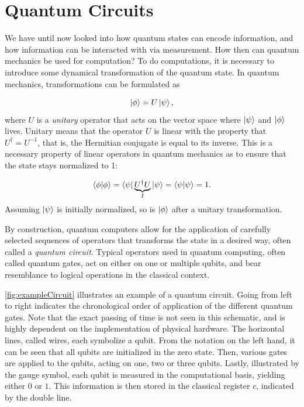 \section{Quantum Circuits}\label{sec:QuantumCircuits}
We have until now looked into how quantum states can encode information, and how information can be interacted with via measurement. How then can quantum mechanics be used for computation? To do computations, it is necessary to introduce some dynamical transformation of the quantum state. In quantum mechanics, transformations can be formulated as 

\begin{equation}\label{eq:UnitaryEvolution}
 \ket{\phi} = U\ket{\psi},
\end{equation}
where $U$ is a \emph{unitary} operator that acts on the vector space where $\ket{\psi}$ and $\ket{\phi}$ lives. Unitary means that the operator $U$ is linear with the property that $U^{\dagger} = U^{-1}$, that is, the Hermitian conjugate is equal to its inverse. This is a necessary property of linear operators in quantum mechanics as to ensure that the state stays normalized to 1:

\begin{equation}\label{eq:UnitaryEvolution}
 \braket{\phi}{\phi} = \bra{\psi}\underset{I}{\underbrace{U^{\dagger}U}}\ket{\psi} = \bra{\psi}\ket{\psi} =1.
\end{equation}
Assuming $\ket{\psi}$ is initially normalized, so is $\ket{\phi}$ after a unitary transformation.

By construction, quantum computers allow for the application of carefully selected sequences of operators that transforms the state in a desired way, often called a \emph{quantum circuit}. Typical operators used in quantum computing, often called quantum gates, act on either on one or multiple qubits, and bear resemblance to logical operations in the classical context. 

\autoref{fig:exampleCircuit} illustrates an example of a quantum circuit. Going from left to right indicates the chronological order of application of the different quantum gates. Note that the exact passing of time is not seen in this schematic, and is highly dependent on the implementation of physical hardware. The horizontal lines, called wires, each symbolize a qubit. From the notation on the left hand, it can be seen that all qubits are initialized in the zero state. Then, various gates are applied to the qubits, acting on one, two or three qubits. Lastly, illustrated by the gauge symbol, each qubit is measured in the computational basis, yielding either $0$ or $1$. This information is then stored in the classical register $c$, indicated by the double line. 

